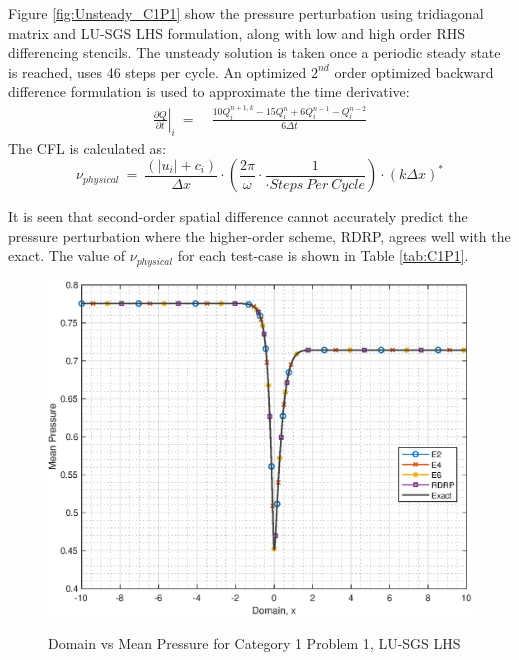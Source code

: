 \documentclass[conf]{new-aiaa}
\begin{document}
Figure \ref{fig:Unsteady_C1P1} show the pressure perturbation using tridiagonal matrix and LU-SGS LHS formulation, along with low and high order RHS differencing stencils. 
The unsteady solution is taken once a periodic steady state is reached, uses 46 steps per cycle. An optimized $2^{nd}$ order optimized backward difference formulation \cite{HixonImplicit} is used to approximate the time derivative:
\begin{equation}
	\begin{split}
		\label{eq:2ndOrderdQdT}
  			\left.\frac{\partial{Q}}{\partial{t}}\right|_i~=&~\frac{10Q_i^{n+1, k}-15Q_i^n+6Q_i^{n-1}-Q_i^{n-2}}{6\Delta{t}}
	\end{split}
\end{equation}
The CFL is calculated as:
\begin{equation*}
	\nu_{physical}
  			~=~\frac{\left(\left|u_i\right|+c_i\right)}{\Delta{x}}\cdot\left(\frac{2\pi}{\omega}\cdot\frac{1}{\cdot Steps~Per~Cycle}\right)\cdot\left(k\Delta{x}\right)^*
\end{equation*}


It is seen that second-order spatial difference cannot accurately predict the pressure perturbation where the higher-order scheme, RDRP, agrees well with the exact. 
The value of $\nu_{physical}$ for each test-case is shown in Table \ref{tab:C1P1}.   


\begin{figure}[hbtp!]
	\centering
	{\includegraphics[width=.7\textwidth]{Figures/LUSGS_C1P1}}
	\caption{Domain vs Mean Pressure for Category 1 Problem 1, LU-SGS LHS}
	\label{fig:LUSGS_C1P1}
\end{figure}
\end{document}
